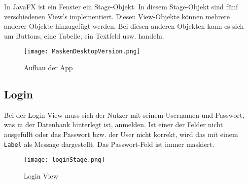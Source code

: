 In JavaFX ist ein Fenster ein Stage-Objekt. In diesem Stage-Objekt sind fünf verschiedenen View's implementiert. Diesen View-Objekte können mehrere anderer Objekte hinzugefügt werden. Bei diesen anderen Objekten kann es sich um Buttons, eine Tabelle, ein Textfeld usw. handeln.

\begin{figure}[h]
  \begin{center}
    \texttt{[image: MaskenDesktopVersion.png]}
  		  \caption{Aufbau der App}
     \label{fig.MaskenDesktopVersion}
  \end{center}
\end{figure}\newpage

\subsection{Login}
\label{subsec.login}
Bei der Login View muss sich der Nutzer mit seinem Usernamen und Passwort, was in der Datenbank hinterlegt ist, anmelden. Ist einer der Felder nicht ausgefüllt oder das Passwort bzw. der User nicht korrekt, wird das mit einem \texttt{Label} als Message dargestellt. Das Passwort-Feld ist immer maskiert. %
%
\begin{figure}[h]
  \begin{center}
    \texttt{[image: loginStage.png]}
  		  \caption{Login View}
     \label{fig.loginFenster}
  \end{center}
\end{figure}

